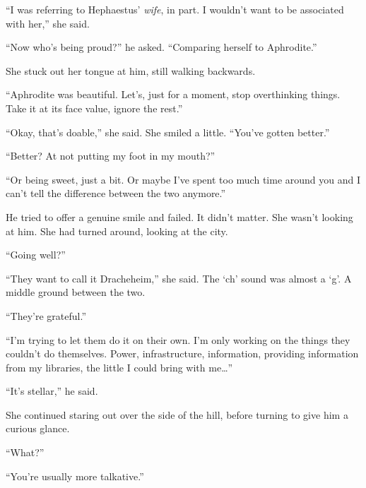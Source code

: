 ``I was referring to Hephaestus' \emph{wife}, in part.  I wouldn't want to be associated with her,'' she said.



``Now who's being proud?'' he asked.  ``Comparing herself to Aphrodite.''



She stuck out her tongue at him, still walking backwards.



``Aphrodite was beautiful.  Let's, just for a moment, stop overthinking things.  Take it at its face value, ignore the rest.''



``Okay, that's doable,'' she said.  She smiled a little.  ``You've gotten better.''



``Better?  At not putting my foot in my mouth?''



``Or being sweet, just a bit.  Or maybe I've spent too much time around you and I can't tell the difference between the two anymore.''



He tried to offer a genuine smile and failed.  It didn't matter.  She wasn't looking at him.  She had turned around, looking at the city.



``Going well?''



``They want to call it Dracheheim,'' she said.  The `ch' sound was almost a `g'.  A middle ground between the two.



``They're grateful.''



``I'm trying to let them do it on their own.  I'm only working on the things they couldn't do themselves.  Power, infrastructure, information, providing information from my libraries, the little I could bring with me\ldots''



``It's stellar,'' he said.



She continued staring out over the side of the hill, before turning to give him a curious glance.



``What?''



``You're usually more talkative.''



